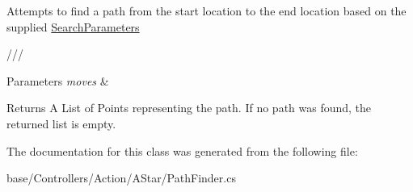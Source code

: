 Attempts to find a path from the start location to the end location based on the supplied \hyperlink{classAStar_1_1SearchParameters}{Search\-Parameters} 

/// 
\begin{DoxyParams}{Parameters}
{\em moves} & \\
\hline
\end{DoxyParams}
\begin{DoxyReturn}{Returns}
A List of Points representing the path. If no path was found, the returned list is empty.
\end{DoxyReturn}


The documentation for this class was generated from the following file\-:\begin{DoxyCompactItemize}
\item 
base/\-Controllers/\-Action/\-A\-Star/Path\-Finder.\-cs\end{DoxyCompactItemize}

